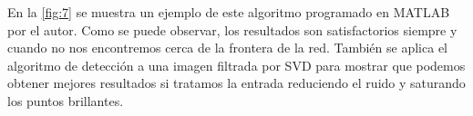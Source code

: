 \newpage

En la \autoref{fig:7} se muestra un ejemplo de este algoritmo programado en MATLAB por el autor. Como se puede observar, los resultados son satisfactorios siempre y cuando no nos encontremos cerca de la frontera de la red. También se aplica el algoritmo de detección a una imagen filtrada por SVD para mostrar que podemos obtener mejores resultados si tratamos la entrada reduciendo el ruido y saturando  los puntos brillantes.


